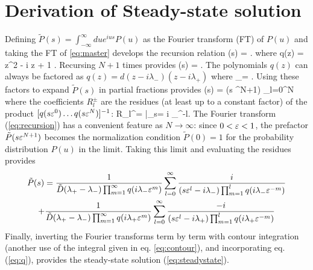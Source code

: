 \section{Derivation of Steady-state solution}
\label{sec:langsteadyderiv}
Defining $\tilde{P}(s) = \int_{-\infty}^\infty du e^{i u s} P(u) $ as the Fourier transform (FT) of $P(u)$ and taking the FT of \ref{eq:master} develops the recursion relation
\be {}(s) = . \ee
where
\be q(z) =  z^2 - i \tilde{\Gamma} z + 1 . \label{eq:q} \ee
Recursing $N+1$ times provides
\be {}(s) = .\label{eq:recursion}\ee
The polynomials $q(z)$ can always be factored as $q(z) = d(z - i\lambda_-)(z - i\lambda_+)$ where
\be \lambda_\pm = . \label{eq:lambdas}\ee
Using these factors to expand $\tilde{P}(s)$ in partial fractions provides
\be {}(s)  = (s \ve^{N+1}) \sum_{l=0}^N   \ee
where the coefficients $R_l^\pm$ are the residues (at least up to a constant factor) of the product $[q(s\varepsilon^0)\dots q(s\varepsilon^N)]^{-1}$:
\be R_l^\pm =  \Big|_{s= i \lambda_\pm \ve^{-l}}.\ee
The Fourier transform (\ref{eq:recursion}) has a convenient feature as $N\rightarrow \infty$: since $0<\varepsilon <1$, the prefactor $\tilde{P}( s \varepsilon^{N+1})$ becomes the normalization condition $\tilde{P}(0)=1$ for the probability distribution $P(u)$ in the limit.
Taking this limit and evaluating the residues provides 
\begin{multline} \tilde{P}(s) = \frac{1}{\tilde{D}(\lambda_+ - \lambda_-) \prod_{m=1}^\infty q(i \lambda_- \varepsilon^m)} \sum_{l=0}^\infty \frac{i}{(s\varepsilon^l-i\lambda_-)\prod_{m=1}^l q(i\lambda_- \varepsilon^{-m})} 
	\\+ \frac{1}{\tilde{D}(\lambda_+ - \lambda_-) \prod_{m=1}^\infty q(i \lambda_+ \varepsilon^m)} \sum_{l=0}^\infty \frac{-i}{(s\varepsilon^l-i \lambda_+)\prod_{m=1}^l q(i\lambda_+ \varepsilon^{-m})} \end{multline}
Finally, inverting the Fourier transforms term by term with contour integration (another use of the integral given in eq. \ref{eq:contour}), and incorporating eq. (\ref{eq:q}), provides the steady-state solution (\ref{eq:steadystate}).

